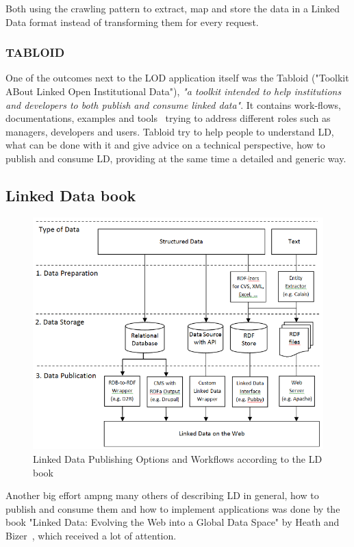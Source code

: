 Both using the crawling pattern to extract, map and store the data in a Linked Data format instead of transforming them for every request.

\subsubsection{TABLOID}
One of the outcomes next to the LOD application itself was the Tabloid ("Toolkit ABout Linked Open Institutional Data"), \emph{"a toolkit intended to help institutions and developers to both publish and consume linked data"}. It contains work-flows, documentations, examples and tools~\cite{lucero:tabloid} trying to address different roles such as managers, developers and users. Tabloid try to help people to understand LD, what can be done with it and give advice on a technical perspective, how to publish and consume LD, providing at the same time a detailed and generic way.

\subsection{Linked Data book}

\begin{figure}[ht]
	\centering
\includegraphics[width=\textwidth]{img/ld_architecture.png}
	\caption{Linked Data Publishing Options and Workflows according to the LD book}
	\label{ld_architecture}
\end{figure}

Another big effort ampng many others of describing LD in general, how to publish and consume them and how to implement applications was done by the book "Linked Data: Evolving the Web into a Global Data Space" by Heath and Bizer~\cite{heath2011linked}, which received a lot of attention.

